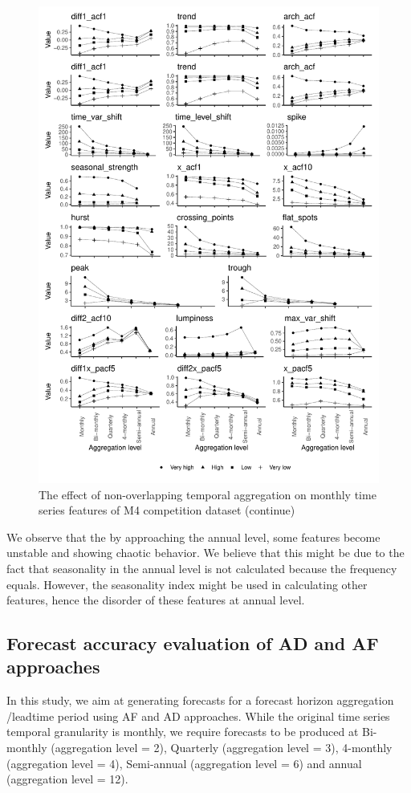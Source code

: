 \documentclass[]{elsarticle} %
\begin{document}
\begin{figure}[H]

{\centering \includegraphics[width=0.7\linewidth]{img/mp_category_all2} 

}

\caption{The effect of non-overlapping temporal aggregation on monthly time series features of M4 competition dataset (continue)}\label{fig:featureagg2}
\end{figure}

We observe that the by approaching the annual level, some features
become unstable and showing chaotic behavior. We believe that this might
be due to the fact that seasonality in the annual level is not
calculated because the frequency equals. However, the seasonality index
might be used in calculating other features, hence the disorder of these
features at annual level.

\hypertarget{forecast-accuracy-evaluation-of-ad-and-af-approaches}{%
\subsection{Forecast accuracy evaluation of AD and AF
approaches}\label{forecast-accuracy-evaluation-of-ad-and-af-approaches}}

In this study, we aim at generating forecasts for a forecast horizon
aggregation /leadtime period using AF and AD approaches. While the
original time series temporal granularity is monthly, we require
forecasts to be produced at Bi-monthly (aggregation level = 2),
Quarterly (aggregation level = 3), 4-monthly (aggregation level = 4),
Semi-annual (aggregation level = 6) and annual (aggregation level = 12).
\end{document}
